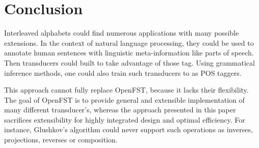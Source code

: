 \documentclass[journal]{journal}
\begin{document}



\section{Conclusion}

Interleaved alphabets could find numerous applications with many possible extensions. In the context of natural language processing, they could be used to annotate human sentences with linguistic meta-information like parts of speech. Then transducers could built to take advantage of those tag. Using grammatical inference methods, one could also train such transducers to as POS taggers.

This approach cannot fully replace OpenFST, because it lacks their flexibility. The goal of OpenFST is to provide general and extensible implementation of many different transducer's, whereas the approach presented in this paper sacrifices extensibility for highly integrated design and optimal efficiency. For instance, Glushkov's algorithm could never support such operations  as inverses, projections, reverses or composition. 



%
\end{document}
